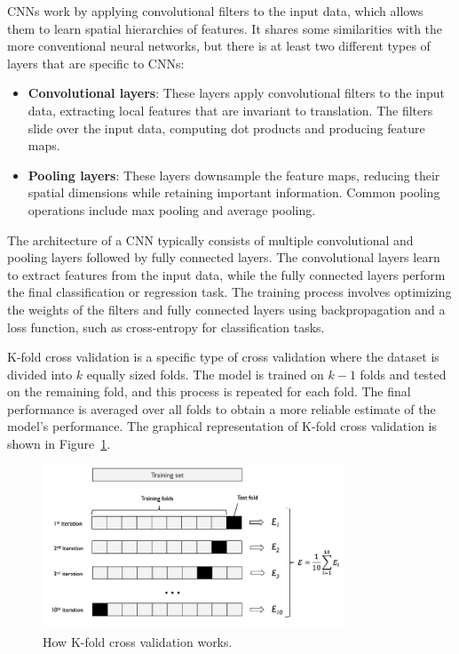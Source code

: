 CNNs work by applying convolutional filters to the input data, which allows them to learn spatial hierarchies of features.
It shares some similarities with the more conventional neural networks, but there is at least two different types
of layers that are specific to CNNs:

\begin{itemize}
	\item \textbf{Convolutional layers}: These layers apply convolutional filters to the input data, extracting local features
	      that are invariant to translation. The filters slide over the input data, computing dot products and producing feature maps.
	\item \textbf{Pooling layers}: These layers downsample the feature maps, reducing their spatial dimensions while retaining important
	      information. Common pooling operations include max pooling and average pooling.
\end{itemize}

The architecture of a CNN typically consists of multiple convolutional and pooling layers followed by fully connected layers.
The convolutional layers learn to extract features from the input data, while the fully connected layers perform the final classification
or regression task. The training process involves optimizing the weights of the filters and fully connected layers using backpropagation
and a loss function, such as cross-entropy for classification tasks.

\label{subsubsec:k_fold_cross_validation}

K-fold cross validation is a specific type of cross validation where the dataset is divided into $k$ equally sized folds. The model is trained
on $k-1$ folds and tested on the remaining fold, and this process is repeated for each fold. The final performance is averaged over all folds
to obtain a more reliable estimate of the model's performance. The graphical representation of K-fold cross validation is shown in Figure~\ref{fig:k_fold}.

\begin{figure}[htbp]
	\centering
	\includegraphics[width=0.8\textwidth]{../imgs/kfold.png}
	\caption{How K-fold cross validation works.\textsuperscript{\cite{Raschka-Mirjalili-2017}}}
	\label{fig:k_fold}
\end{figure}

